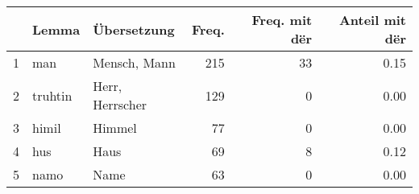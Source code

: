 \begin{tabular}{rllrrr}
  \hline
 & Lemma & Übersetzung & Freq. & Freq. mit dër & Anteil mit dër \\ 
  \hline
1 & man & Mensch, Mann & 215 &  33 & 0.15 \\ 
  2 & truhtin & Herr, Herrscher & 129 &   0 & 0.00 \\ 
  3 & himil & Himmel &  77 &   0 & 0.00 \\ 
  4 & hus & Haus &  69 &   8 & 0.12 \\ 
  5 & namo & Name &  63 &   0 & 0.00 \\ 
   \hline
\end{tabular}
